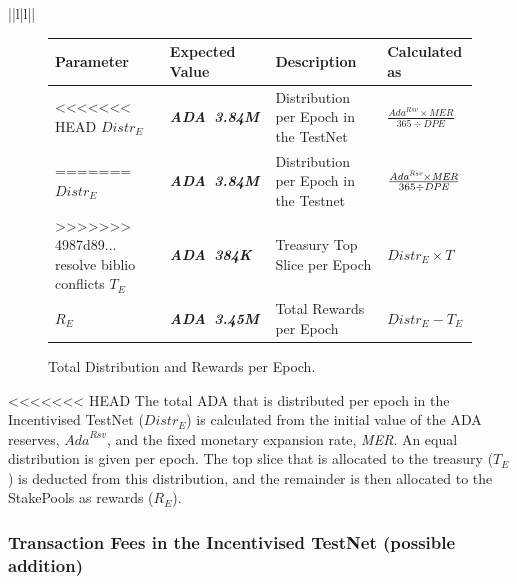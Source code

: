 \documentclass[11pt,a4paper,dvipsnames,twosided,final]{article}
\newcommand{\ada}{ADA{}}
\newcommand{\ADA}[1]{\textbf{\emph{\ada~{#1}}}}
\begin{document}
\begin{tabular}{||l|l||}
\begin{figure}[h!]
\begin{center}
\begin{tabular}{||l|l|p{6cm}|l||}
  \hline \hline
\textbf{Parameter} & \textbf{Expected Value} & \textbf{Description} & \textbf{Calculated as} \\\hline
<<<<<<< HEAD
$\textit{Distr}_E$ & \ADA{3.84M} & Distribution per Epoch in the TestNet & $\frac{\textit{Ada}^{\textit{Rsv}} \times \textit{MER}}{365 \div \textit{DPE}}$ \\\hline
=======
$\textit{Distr}_E$ & \ADA{3.84M} & Distribution per Epoch in the Testnet & $\frac{\large \textit{Ada}^{\textit{Rsv}} \times \textit{MER}}{\large 365 \div \textit{DPE}}$ \\\hline
>>>>>>> 4987d89... resolve biblio conflicts
$T_E$ & \ADA{384K} & Treasury Top Slice per Epoch & $\textit{Distr}_E \times T$ \\\hline
$R_E$ & \ADA{3.45M} & Total Rewards per Epoch & $\textit{Distr}_E - T_E$ \\\hline
  \hline
\end{tabular}
\end{center}
\caption{Total Distribution and Rewards per Epoch.}
\label{fig:distrib}
\end{figure}

\noindent
<<<<<<< HEAD
The total \ada{} that is distributed per epoch in the Incentivised TestNet (${\textit{Distr}}_E$) is calculated from the initial
value of the \ada{} reserves, $\textit{Ada}^{\textit{Rsv}}$, and the fixed monetary expansion rate, \textit{MER}.
An equal distribution is given per epoch.  The top slice that is allocated to the treasury ($T_E$) is
deducted from this distribution, and the remainder is then allocated to the StakePools as rewards ($R_E$).

\subsubsection*{Transaction Fees in the Incentivised TestNet (possible addition)}


\end{tabular}
\end{document}
